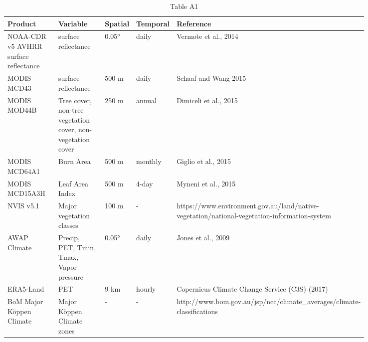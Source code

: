 \documentclass[gc, manuscript]{copernicus}
\begin{document}
\appendixtables
\clearpage
\begin{table}
\caption{\label{tab:table-name} Table A1}
\begin{tabular}{|p{0.2\linewidth}|p{0.2\linewidth}|p{0.06\linewidth}|p{0.08\linewidth}|p{0.3\linewidth}|}
\hline
Product & Variable & Spatial & Temporal & Reference\\
\hline
NOAA-CDR v5 AVHRR surface reflectance & surface reflectance & 0.05° & daily & Vermote et al., 2014\\
\hline
MODIS MCD43 & surface reflectance & 500 m & daily & Schaaf and Wang 2015\\
\hline
MODIS MOD44B & Tree cover, non-tree vegetation cover, non-vegetation cover & 250 m & annual & Dimiceli et al., 2015\\
\hline
MODIS MCD64A1 & Burn Area & 500 m & monthly & Giglio et al., 2015\\
\hline
MODIS MCD15A3H & Leaf Area Index & 500 m & 4-day & Myneni et al., 2015\\
\hline
NVIS v5.1 & Major vegetation classes & 100 m & - & https://www.environment.gov.au/land/native-vegetation/national-vegetation-information-system\\
\hline
AWAP Climate & Precip, PET, Tmin, Tmax, Vapor pressure & 0.05° & daily & Jones et al., 2009\\
\hline
ERA5-Land & PET & 9 km & hourly & Copernicus Climate Change Service (C3S) (2017)\\
\hline
BoM Major Köppen Climate & Major Köppen Climate zones & - & - & http://www.bom.gov.au/jsp/ncc/climate\_averages/climate-classifications\\
\hline
\end{tabular}
\end{table}
\clearpage
\noappendix



\end{document}
